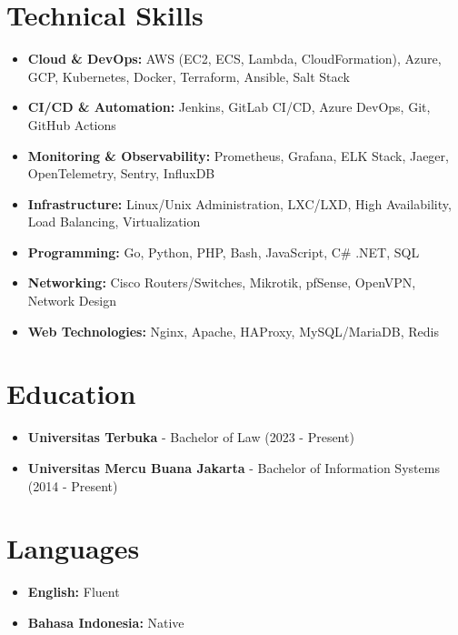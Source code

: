 \documentclass[11pt,a4paper]{article}
\newcommand{\skill}[1]{\textbf{#1}}
\begin{document}
\section{Technical Skills}
\begin{itemize}[leftmargin=*, itemsep=4pt]
    \item \skill{Cloud \& DevOps:} AWS (EC2, ECS, Lambda, CloudFormation), Azure, GCP, Kubernetes, Docker, Terraform, Ansible, Salt Stack
    \item \skill{CI/CD \& Automation:} Jenkins, GitLab CI/CD, Azure DevOps, Git, GitHub Actions
    \item \skill{Monitoring \& Observability:} Prometheus, Grafana, ELK Stack, Jaeger, OpenTelemetry, Sentry, InfluxDB
    \item \skill{Infrastructure:} Linux/Unix Administration, LXC/LXD, High Availability, Load Balancing, Virtualization
    \item \skill{Programming:} Go, Python, PHP, Bash, JavaScript, C\# .NET, SQL
    \item \skill{Networking:} Cisco Routers/Switches, Mikrotik, pfSense, OpenVPN, Network Design
    \item \skill{Web Technologies:} Nginx, Apache, HAProxy, MySQL/MariaDB, Redis
\end{itemize}

\section{Education}
\begin{itemize}[leftmargin=*, itemsep=2pt]
    \item \textbf{Universitas Terbuka} - Bachelor of Law (2023 - Present)
    \item \textbf{Universitas Mercu Buana Jakarta} - Bachelor of Information Systems (2014 - Present)
\end{itemize}

\section{Languages}
\begin{itemize}[leftmargin=*, itemsep=2pt]
    \item \textbf{English:} Fluent
    \item \textbf{Bahasa Indonesia:} Native
\end{itemize}
\end{document}
